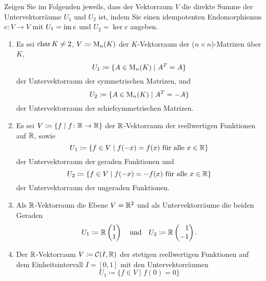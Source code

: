 \begin{question}[subtitle = Konstruktion idempotenter Endomorphismen]{3}
  Zeigen Sie im Folgenden jeweils, dass der Vektorraum $V$ die direkte Summe der Untervektorräume $U_1$ und $U_2$ ist, indem Sie einen idempotenten Endomorphismus $e \colon V \to V$ mit $U_1 = \operatorname{im} e$ und $U_2 = \ker e$ angeben.
  \begin{enumerate}[leftmargin=*]
    \item
      Es sei $\operatorname{char} K \neq 2$, $V \coloneqq \operatorname{M}_n(K)$ der $K$-Vektorraum der ($n \times n$)-Matrizen über $K$,
      \[
        U_1 \coloneqq \{ A \in \operatorname{M}_n(K) \mid A^T = A \}
      \]
      der Untervektorraum der symmetrischen Matrizen, und
      \[
        U_2 \coloneqq \{ A \in \operatorname{M}_n(K) \mid A^T = -A \}
      \]
      der Untervektorraum der schiefsymmetrischen Matrizen.
    \item
      Es sei $V \coloneqq \{ f \mid f \colon \mathbb{R} \to \mathbb{R} \}$ der $\mathbb{R}$-Vektorraum der reellwertigen Funktionen auf $\mathbb{R}$, sowie
      \[
        U_1 \coloneqq \{ f \in V \mid \text{$f(-x) = f(x)$ für alle $x \in \mathbb{R}$} \}
      \]
      der Untervektorraum der geraden Funktionen und
      \[
        U_2 \coloneqq \{ f \in V \mid \text{$f(-x) = -f(x)$ für alle $x \in \mathbb{R}$} \}
      \]
      der Untervektorraum der ungeraden Funktionen.
    \item
      Als $\mathbb{R}$-Vektorraum die Ebene $V = \mathbb{R}^2$ und als Untervektorräume die beiden Geraden
      \[
        U_1 \coloneqq \mathbb{R} \begin{pmatrix} 1 \\  1 \end{pmatrix}
        \quad\text{und}\quad
        U_2 \coloneqq \mathbb{R} \begin{pmatrix} \phantom{-}1 \\ -1 \end{pmatrix}.
      \]
    \item
      Der $\mathbb{R}$-Vektorraum $V \coloneqq \mathcal{C}(I, \mathbb{R})$ der stetigen reellwertigen Funktionen auf dem Einheitsintervall $I = [0,1]$ mit den Untervektorräumen
      \[
        U_1 \coloneqq \{f \in V \mid f(0) = 0\}
\]
\end{enumerate}
\end{question}

